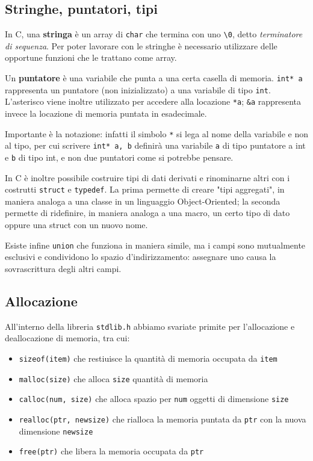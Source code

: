 \documentclass[11pt]{article}
\begin{document}
\subsection{Stringhe, puntatori, tipi}

In C, una \textbf{stringa} è un array di \verb|char| che termina con uno \verb|\0|, detto \textit{terminatore di sequenza}. Per poter lavorare con le stringhe è necessario utilizzare delle opportune funzioni che le trattano come array.

Un \textbf{puntatore} è una variabile che punta a una certa casella di memoria. \verb|int* a| rappresenta un puntatore (non inizializzato) a una variabile di tipo \verb|int|. L'asterisco viene inoltre utilizzato per accedere alla locazione \verb|*a|; \verb|&a| rappresenta invece la locazione di memoria puntata in esadecimale.

Importante è la notazione: infatti il simbolo \verb|*| si lega al nome della variabile e non al tipo, per cui scrivere \verb|int* a, b| definirà una variabile \verb|a| di tipo puntatore a int e \verb|b| di tipo int, e non due puntatori come si potrebbe pensare.

In C è inoltre possibile costruire tipi di dati derivati e rinominarne altri con i costrutti \verb|struct| e \verb|typedef|. La prima permette di creare "tipi aggregati", in maniera analoga a una classe in un linguaggio Object-Oriented; la seconda permette di ridefinire, in maniera analoga a una macro, un certo tipo di dato oppure una struct con un nuovo nome.

Esiste infine \verb|union| che funziona in maniera simile, ma i campi sono mutualmente esclusivi e condividono lo spazio d'indirizzamento: assegnare uno causa la sovrascrittura degli altri campi.

\subsection{Allocazione}

All'interno della libreria \verb|stdlib.h| abbiamo svariate primite per l'allocazione e deallocazione di memoria, tra cui:

\begin{itemize}
    \item\verb|sizeof(item)| che restiuisce la quantità di memoria occupata da \verb|item|
    \item\verb|malloc(size)| che alloca \verb|size| quantità di memoria
    \item\verb|calloc(num, size)| che alloca spazio per \verb|num| oggetti di dimensione \verb|size|
    \item\verb|realloc(ptr, newsize)| che rialloca la memoria puntata da \verb|ptr| con la nuova dimensione \verb|newsize|
    \item \verb|free(ptr)| che libera la memoria occupata da \verb|ptr|
\end{itemize}
\end{document}
